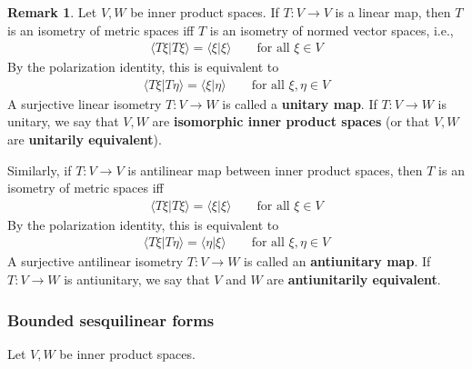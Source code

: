\documentclass[12pt,b5paper,notitlepage]{article}
\theoremstyle{definition}
\newtheorem{rem}[df]{Remark}
\theoremstyle{plain}
\newcommand{\bk}[1]{\langle {#1}\rangle}
\newcommand{\hqed}{\hfill\qedsymbol}
\numberwithin{equation}{section}
\begin{document}
\begin{rem}
Let $V,W$ be inner product spaces. If $T:V\rightarrow V$ is a linear map, then $T$ is an isometry of metric spaces iff $T$ is an isometry of normed vector spaces, i.e., 
\begin{align*}
\bk{T\xi|T\xi}=\bk{\xi|\xi}\qquad \text{for all }\xi\in V
\end{align*}
By the polarization identity, this is equivalent to
\begin{align*}
\bk{T\xi|T\eta}=\bk{\xi|\eta}\qquad \text{for all }\xi,\eta\in V
\end{align*} 
A surjective linear isometry $T:V\rightarrow W$ is called a \textbf{unitary map}.  If $T:V\rightarrow W$ is unitary, we say that $V,W$ are \textbf{isomorphic inner product spaces} (or that $V,W$ are \textbf{unitarily equivalent}).  


Similarly, if $T:V\rightarrow V$ is antilinear map between inner product spaces, then $T$ is an isometry of metric spaces iff
\begin{align*}
\bk{T\xi|T\xi}=\bk{\xi|\xi}\qquad \text{for all }\xi\in V
\end{align*}
By the polarization identity, this is equivalent to
\begin{align*}
\bk{T\xi|T\eta}=\bk{\eta|\xi}\qquad \text{for all }\xi,\eta\in V
\end{align*}
A surjective antilinear isometry $T:V\rightarrow W$ is called an \textbf{antiunitary map}.  If $T:V\rightarrow W$ is antiunitary, we say that $V$ and $W$ are \textbf{antiunitarily equivalent}. \hqed
\end{rem}



\subsubsection{Bounded sesquilinear forms}




Let $V,W$ be inner product spaces.
\end{document}
